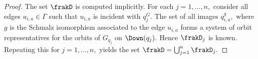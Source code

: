 \begin{proof}
\smallskip

The set $\frakD$ is computed implicitly. 
For each $j = 1,\ldots,n,$ consider all edges $u_{i,a} \in \Gamma$ such that 
$u_{i,a}$ is incident with $q_j^G.$ 
The set of all images $q_{i,a}^g,$ where $g$ 
is the Schmalz isomorphism associated to the edge $u_{i,a}$ 
forms a system of orbit representatives 
for the orbits of $G_{q_j}$ on $\Down(q_j).$ 
Hence $\frakD_j$ is known.
Repeating this for $j=1,\ldots,n,$ yields the set $\frakD = \bigcup_{j=1}^n \frakD_j.$
\eop
\end{proof}



\bigskip
